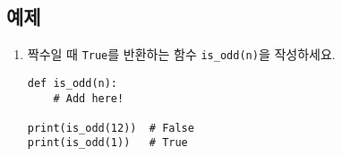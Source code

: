 \documentclass[../main.tex]{subfiles}
\begin{document}
\subsection{예제}
\begin{enumerate}
\item 짝수일 때 \verb|True|를 반환하는 함수 \verb|is_odd(n)|을 작성하세요.
\begin{verbatim}
def is_odd(n):
    # Add here!

print(is_odd(12))  # False
print(is_odd(1))   # True
\end{verbatim}
%

%


\end{enumerate}
\end{document}
